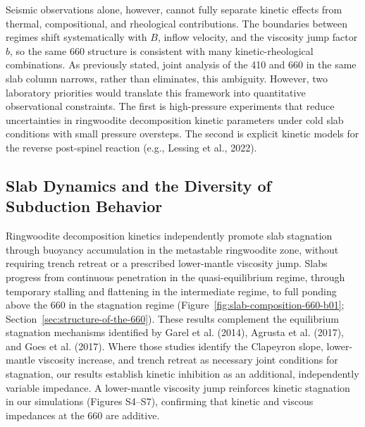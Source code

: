 \documentclass[draft,linenumbers]{agujournal2019}
\begin{document}
Seismic observations alone, however, cannot fully separate kinetic
effects from thermal, compositional, and rheological contributions. The
boundaries between regimes shift systematically with \(B\), inflow
velocity, and the viscosity jump factor \(b\), so the same 660 structure
is consistent with many kinetic-rheological combinations. As previously
stated, joint analysis of the 410 and 660 in the same slab column
narrows, rather than eliminates, this ambiguity. However, two laboratory
priorities would translate this framework into quantitative
observational constraints. The first is high-pressure experiments that
reduce uncertainties in ringwoodite decomposition kinetic parameters
under cold slab conditions with small pressure oversteps. The second is
explicit kinetic models for the reverse post-spinel reaction (e.g.,
Lessing et al., 2022).

\subsection{Slab Dynamics and the Diversity of Subduction
Behavior}\label{sec:slab-dynamics-and-the-diversity-of-subduction-behavior}

Ringwoodite decomposition kinetics independently promote slab stagnation
through buoyancy accumulation in the metastable ringwoodite zone,
without requiring trench retreat or a prescribed lower-mantle viscosity
jump. Slabs progress from continuous penetration in the
quasi-equilibrium regime, through temporary stalling and flattening in
the intermediate regime, to full ponding above the 660 in the stagnation
regime (Figure~\ref{fig:slab-composition-660-b01};
Section~\ref{sec:structure-of-the-660}). These results complement the
equilibrium stagnation mechanisms identified by Garel et al. (2014),
{Agrusta et al.} (2017), and {Goes et al.} (2017). Where those studies
identify the Clapeyron slope, lower-mantle viscosity increase, and
trench retreat as necessary joint conditions for stagnation, our results
establish kinetic inhibition as an additional, independently variable
impedance. A lower-mantle viscosity jump reinforces kinetic stagnation
in our simulations (Figures S4--S7), confirming that kinetic and viscous
impedances at the 660 are additive.
\end{document}

